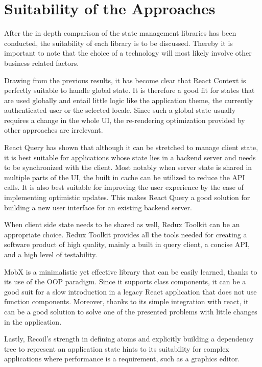 \hypertarget{suitability-the-approaches}{%
    \section{Suitability of the
    Approaches}\label{suitability-the-approaches}}

After the in depth comparison of the state management libraries has been
conducted, the suitability of each library is to be discussed. Thereby
it is important to note that the choice of a technology will most likely
involve other business related factors.

Drawing from the previous results, it has become clear that React
Context is perfectly suitable to handle global state. It is therefore a
good fit for states that are used globally and entail little logic like
the application theme, the currently authenticated user or the selected
locale. Since such a global state usually requires a change
in the whole UI, the re-rendering optimization provided by other
approaches are irrelevant.

React Query has shown that although it can be stretched to manage client
state, it is best suitable for applications whose state lies in a
backend server and needs to be synchronized with the client. Most
notably when server state is shared in multiple parts of the UI, the
built in cache can be utilized to reduce the API calls. It is also best
suitable for improving the user experience by the ease of implementing optimistic
updates. This makes React Query a good solution for building a new user
interface for an existing backend server.

When client side state needs to be shared as well, Redux Toolkit can be
an appropriate choice. Redux Toolkit provides all the tools needed for
creating a software product of high quality, mainly a built in query
client, a concise API, and a high level of testability.

MobX is a minimalistic yet effective library that can be easily learned,
thanks to its use of the OOP paradigm. Since it supports class
components, it can be a good suit for a slow introduction in a legacy
React application that does not use function components. Moreover,
thanks to its simple integration with react, it can be a good solution
to solve one of the presented problems with little
changes in the application.

Lastly, Recoil's strength in defining atoms and explicitly building a
dependency tree to represent an application state hints to its
suitability for complex applications where performance is a requirement,
such as a graphics editor.

